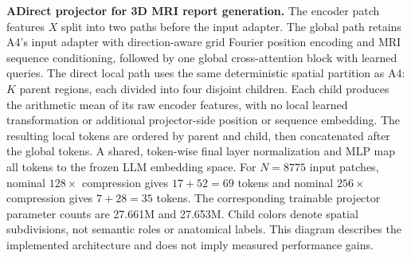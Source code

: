 \caption{\textbf{ADirect projector for 3D MRI report generation.}
The encoder patch features $X$ split into two paths before the input adapter.
The global path retains A4's input adapter with direction-aware grid Fourier
position encoding and MRI sequence conditioning, followed by one global
cross-attention block with learned queries. The direct local path uses the
same deterministic spatial partition as A4: $K$ parent regions, each divided
into four disjoint children. Each child produces the arithmetic mean of its
raw encoder features, with no local learned transformation or additional
projector-side position or sequence embedding. The resulting local tokens
are ordered by parent and child, then concatenated after the global tokens.
A shared, token-wise final layer normalization and MLP map all tokens to
the frozen LLM embedding space. For $N=8775$ input patches, nominal
$128\times$ compression gives $17+52=69$ tokens and nominal $256\times$
compression gives $7+28=35$ tokens. The corresponding trainable projector
parameter counts are 27.661M and 27.653M. Child colors denote spatial
subdivisions, not semantic roles or anatomical labels. This diagram describes
the implemented architecture and does not imply measured performance gains.}
\label{fig:adirect-projector}
